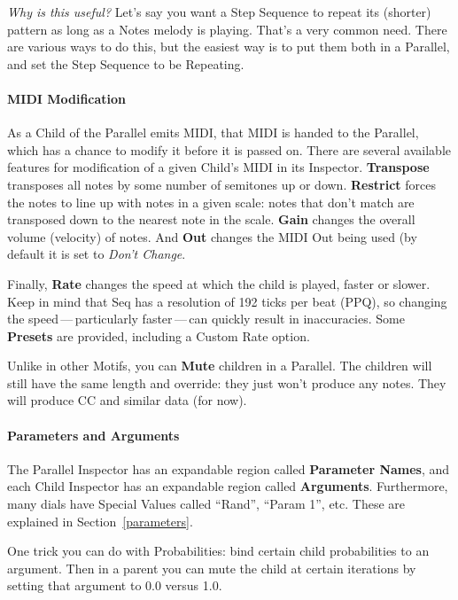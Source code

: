 \documentclass[twoside,10pt]{article}
\begin{document}
{\it Why is this useful?}  Let's say you want a Step Sequence to repeat its (shorter) pattern as long as a Notes melody is playing.  That's a very common need.  There are various ways to do this, but the easiest way is to put them both in a Parallel, and set the Step Sequence to be Repeating. 

\paragraph{MIDI Modification}

As a Child of the Parallel emits MIDI, that MIDI is handed to the Parallel, which has a chance to modify it before it is passed on.  There are several available features for modification of a given Child's MIDI in its Inspector.  {\bf Transpose} transposes all notes by some number of semitones up or down.  {\bf Restrict} forces the notes to line up with notes in a given scale: notes that don't match are transposed down to the nearest note in the scale.  {\bf Gain} changes the overall volume (velocity) of notes.  And {\bf Out} changes the MIDI Out being used (by default it is set to {\it Don't Change}.

Finally, {\bf Rate} changes the speed at which the child is played, faster or slower.  Keep in mind that Seq has a resolution of 192 ticks per beat (PPQ), so changing the speed\,---\,particularly faster\,---\,can quickly result in inaccuracies.    Some {\bf Presets} are provided, including a Custom Rate option.

Unlike in other Motifs, you can {\bf Mute} children in a Parallel.  The children will still have the same length and override: they just won't produce any notes.  They will produce CC and similar data (for now).

\paragraph{Parameters and Arguments}

The Parallel Inspector has an expandable region called {\bf Parameter Names}, and each Child Inspector has an expandable region called {\bf Arguments}. Furthermore, many dials have Special Values called ``Rand'', ``Param 1'', etc.  These are explained in Section~\ref{parameters}.

One trick you can do with Probabilities: bind certain child probabilities to an argument.  Then in a parent you can mute the child at certain iterations by setting that argument to 0.0 versus 1.0.
\end{document}
